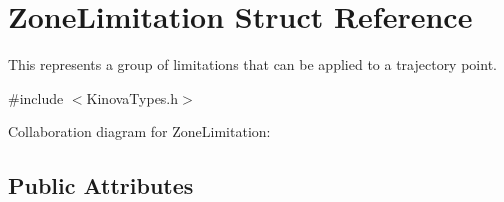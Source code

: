 \hypertarget{struct_zone_limitation}{}\section{Zone\+Limitation Struct Reference}
\label{struct_zone_limitation}


This represents a group of limitations that can be applied to a trajectory point.  




{\ttfamily \#include $<$Kinova\+Types.\+h$>$}



Collaboration diagram for Zone\+Limitation\+:
\subsection*{Public Attributes}
